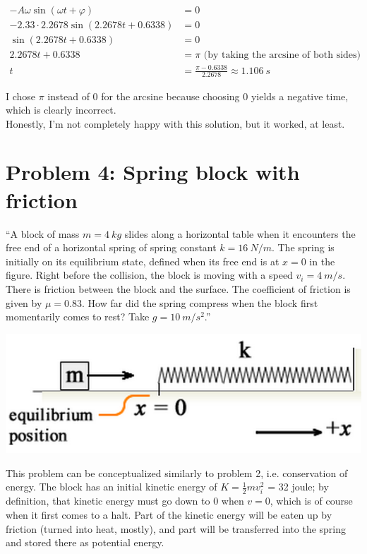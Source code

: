 \documentclass[12pt,a4paper]{report}
\begin{document}
\begin{align}
-A \omega \sin(\omega t + \varphi) &= 0\\
-2.33 \cdot 2.2678 \sin(2.2678 t + 0.6338) &= 0\\
\sin(2.2678 t + 0.6338) &= 0\\
2.2678 t + 0.6338 &= \pi \text{ (by taking the arcsine of both sides)}\\
t &= \frac{\pi - 0.6338}{2.2678} \approx \SI{1.106}{s}
\end{align}

I chose $\pi$ instead of 0 for the arcsine because choosing 0 yields a negative time, which is clearly incorrect.\\
Honestly, I'm not completely happy with this solution, but it worked, at least.

\section{Problem 4: Spring block with friction}

``A block of mass $m = \SI{4}{kg}$ slides along a horizontal table when it encounters the free end of a horizontal spring of spring constant $k = \SI{16}{N/m}$. The spring is initially on its equilibrium state, defined when its free end is at $x = 0$ in the figure. Right before the collision, the block is moving with a speed $v_i = \SI{4}{m/s}$. There is friction between the block and the surface. The coefficient of friction is given by $\mu = 0.83$. How far did the spring compress when the block first momentarily comes to rest? Take $g = \SI{10}{m/s^2}$.''

\begin{center}
\includegraphics[scale=0.65]{Graphics/h4p4}
\end{center}

This problem can be conceptualized similarly to problem 2, i.e. conservation of energy. The block has an initial kinetic energy of $K = \frac{1}{2} m v_i^2$ = 32 joule; by definition, that kinetic energy must go down to $0$ when $v = 0$, which is of course when it first comes to a halt. Part of the kinetic energy will be eaten up by friction (turned into heat, mostly), and part will be transferred into the spring and stored there as potential energy.
\end{document}
